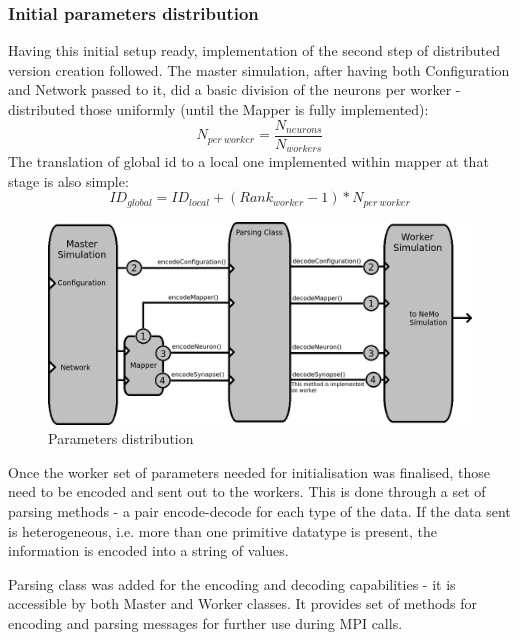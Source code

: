 \subsubsection{Initial parameters distribution}

Having this initial setup ready, implementation of the second step of distributed version creation followed.
The master simulation, after having both Configuration and Network passed to it, did a basic division of the neurons per worker - distributed those uniformly (until the Mapper is fully implemented):
\begin{equation}N_{per\ worker} = \frac{N_{neurons}}{N_{workers}}\end{equation}
The translation of global id to a local one implemented within mapper at that stage is also simple:
\begin{equation}ID_{global} = ID_{local} + (Rank_{worker}-1)*N_{per\ worker}\end{equation}

\begin{figure}[h]
\begin{center}
\includegraphics[scale = 0.5]{images/implementation/distribution.png}
\end{center}
\caption{Parameters distribution}
\end{figure}

Once the worker set of parameters needed for initialisation was finalised, those need to be encoded and sent out to the workers. This is done through a set of parsing methods - a pair encode-decode for each type of the data. If the data sent is heterogeneous, i.e. more than one primitive datatype is present, the information is encoded into a string of values.

Parsing class was added for the encoding and decoding capabilities - it is accessible by both Master and Worker classes. It provides set of methods for encoding and parsing messages for further use during MPI calls.

